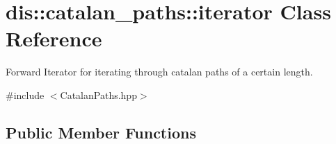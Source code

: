 \hypertarget{classdis_1_1catalan__paths_1_1iterator}{\section{dis\-:\-:catalan\-\_\-paths\-:\-:iterator Class Reference}
\label{classdis_1_1catalan__paths_1_1iterator}
}


Forward Iterator for iterating through catalan paths of a certain length.  




{\ttfamily \#include $<$Catalan\-Paths.\-hpp$>$}

\subsection*{Public Member Functions}
